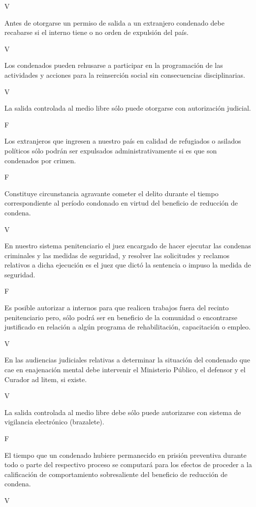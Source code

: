 \documentclass[letterpaper, 11pt]{article}
\begin{document}
V

Antes de otorgarse un permiso de salida a un extranjero condenado debe
recabarse si el interno tiene o no orden de expulsión del país.

V

Los condenados pueden rehusarse a participar en la programación de las
actividades y acciones para la reinserción social sin consecuencias disciplinarias.

V

La salida controlada al medio libre sólo puede otorgarse con autorización judicial.

F

Los extranjeros que ingresen a nuestro país en calidad de refugiados o asilados
políticos sólo podrán ser expulsados administrativamente si es que son
condenados por crimen.

F

Constituye circunstancia agravante cometer el delito durante el tiempo
correspondiente al período condonado en virtud del beneficio de reducción de
condena.

V

En nuestro sistema penitenciario el juez encargado de hacer ejecutar las condenas
criminales y las medidas de seguridad, y resolver las solicitudes y reclamos
relativos a dicha ejecución es el juez que dictó la sentencia o impuso la medida de
seguridad.

F

Es posible autorizar a internos para que realicen trabajos fuera del recinto
penitenciario pero, sólo podrá ser en beneficio de la comunidad o encontrarse
justificado en relación a algún programa de rehabilitación, capacitación o empleo.

V

En las audiencias judiciales relativas a determinar la situación del condenado que
cae en enajenación mental debe intervenir el Ministerio Público, el defensor y el
Curador ad litem, si existe.

V

La salida controlada al medio libre debe sólo puede autorizarse con sistema de
vigilancia electrónico (brazalete).

F

El tiempo que un condenado hubiere permanecido en prisión preventiva durante
todo o parte del respectivo proceso se computará para los efectos de proceder a la
calificación de comportamiento sobresaliente del beneficio de reducción de
condena.

V
\end{document}
